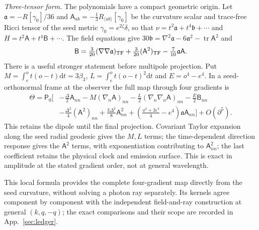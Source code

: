 \documentclass[11pt]{article}
\theoremstyle{definition}
\theoremstyle{remark}
\newcommand{\dd}{\mathrm{d}}
\begin{document}
\emph{Three-tensor form.} The polynomials have a compact geometric origin. Let
$\mathfrak a=-R[\gamma_0]/36$ and $\mathsf A_{ab}=-\frac13R_{\langle ab\rangle}[\gamma_0]$ be the
curvature scalar and trace-free Ricci tensor of the seed metric $\gamma_0=e^{2\zeta}\delta$, so
that $\nu=t^2\mathfrak a+t^4\mathfrak b+\cdots$ and $H=t^2\mathsf A+t^4\mathsf B+\cdots$. The field
equations give $30\mathfrak b=\nabla^2\mathfrak a-6\mathfrak a^2-\operatorname{tr}\mathsf A^2$ and
\[
\mathsf B=\tfrac3{20}(\nabla\nabla\mathfrak a)_{\rm TF}+\tfrac3{20}(\mathsf A^2)_{\rm TF}-\tfrac7{10}\mathfrak a\mathsf A .
\]
There is a useful stronger statement before multipole projection. Put
$M=\int_e^ot(o-t)\dd t=3\beta_3$, $L=\int_e^ot(o-t)^2\dd t$ and $E=o^4-e^4$.
In a seed-orthonormal frame at the observer the full map through four gradients is
\begin{equation}\label{eq:curvature-full-map}
\begin{split}
\Theta=\mathsf P_0\bigg[&-\tfrac\Delta2\mathsf A_{nn}
-M(\nabla_n\mathsf A)_{nn}-\tfrac L2(\nabla_n\nabla_n\mathsf A)_{nn}
-\tfrac E2\mathsf B_{nn}\\
&-\tfrac{\Delta^2}{4}(\mathsf A^2)_{nn}
+\tfrac{3\Delta^2}{8}\mathsf A_{nn}^2
+\left(\tfrac{o^4+3\iota^4}{4}-e^4\right)\mathfrak a\mathsf A_{nn}\bigg]
+O(\partial^5).
\end{split}
\end{equation}
This retains the dipole until the final projection. Covariant Taylor expansion along the
seed radial geodesic gives the $M,L$ terms; the time-dependent direction response gives
the $\mathsf A^2$ terms, with exponentiation contributing to $\mathsf A_{nn}^2$; the last
coefficient retains the physical clock and emission surface. This is exact in amplitude
at the stated gradient order, not at general wavelength.

This local formula provides the complete four-gradient map directly from the seed
curvature, without solving a photon ray separately. Its kernels agree component by
component with the independent field-and-ray construction at general $(k,q,-q)$;
the exact comparisons and their scope are recorded in App.~\ref{sec:ledger}.
\end{document}
